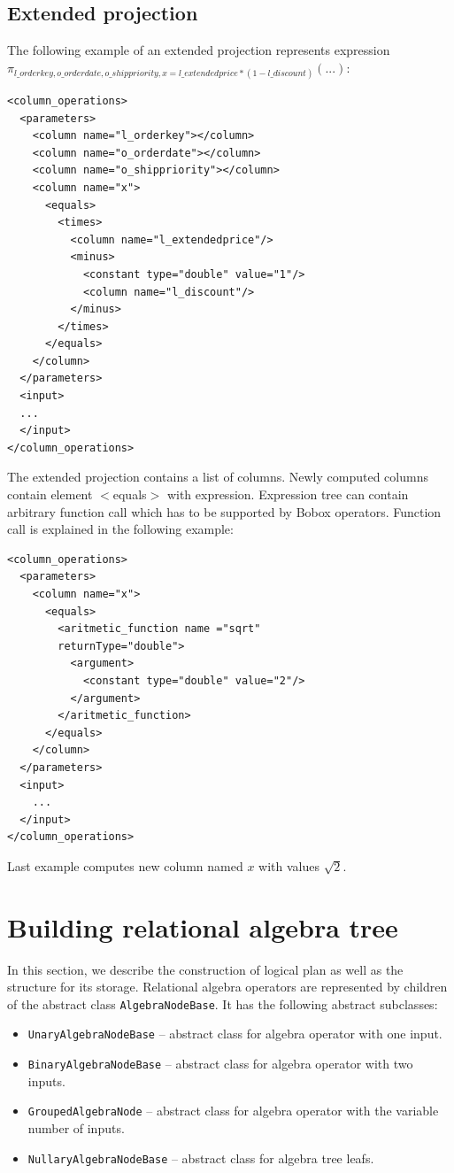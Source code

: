\subsection{Extended projection}
The following example of an extended projection represents expression \\ $\pi_{l\_orderkey,o\_orderdate,o\_shippriority,x=l\_extendedprice*(1-l\_discount)}(...)$:
\begin{lstlisting}
<column_operations>
  <parameters>
    <column name="l_orderkey"></column>
    <column name="o_orderdate"></column>
    <column name="o_shippriority"></column>
    <column name="x">
      <equals>
        <times>
          <column name="l_extendedprice"/>
          <minus>
            <constant type="double" value="1"/>
            <column name="l_discount"/>
          </minus>
        </times>
      </equals>
    </column>
  </parameters>
  <input>
  ...
  </input>
</column_operations>
\end{lstlisting}

The extended projection contains a list of columns. Newly computed columns contain element $<$equals$>$ with expression. Expression tree can contain arbitrary function call which has to be supported by Bobox operators. Function call is explained in the following example:


\begin{lstlisting}
<column_operations>
  <parameters>
    <column name="x">
      <equals>
        <aritmetic_function name ="sqrt" 
        returnType="double">
          <argument>
            <constant type="double" value="2"/>
          </argument>
        </aritmetic_function>
      </equals>
    </column>
  </parameters>
  <input>
    ...
  </input>
</column_operations>
\end{lstlisting}
 
Last example computes new column named $x$ with values $\sqrt{2}$.
 
\section{Building relational algebra tree} 

In this section, we describe the construction of logical plan as well as the structure for its storage. Relational algebra operators are represented by children of the abstract class \texttt{AlgebraNodeBase}. It has the following abstract subclasses:
\begin{itemize}

\item \texttt{UnaryAlgebraNodeBase} -- abstract class for algebra operator with one input.

\item \texttt{BinaryAlgebraNodeBase}  -- abstract class for algebra operator with two inputs.

\item \texttt{GroupedAlgebraNode} -- abstract class for algebra operator with the variable number of inputs.

\item \texttt{NullaryAlgebraNodeBase} --  abstract class for algebra tree leafs.

\end{itemize}

